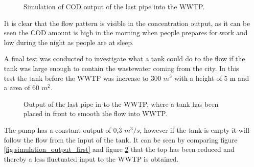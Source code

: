 \begin{figure}[H]
\centering

\caption{Simulation of COD output of the last pipe into the WWTP.}
\label{fig:simulation_output_first_concentration}
\end{figure}  

It is clear that the flow pattern is visible in the concentration output, as it can be seen the COD amount is high in the morning when people prepares for work and low during the night as people are at sleep.  


A final test was conducted to investigate what a tank could do to the flow if the tank was large enough to contain the wastewater coming from the city. In this test the tank before the WWTP was increase to 300 $m^3$ with a height of 5 m and a area of 60 $m^2$.

\begin{figure}[H]
\centering

\caption{Output of the last pipe in to the WWTP, where a tank has been placed in front to smooth the flow into WWTP.}
\label{fig:simulation_output_second}
\end{figure} 
The pump has a constant output of 0,3 $m^3/s$, however if the tank is empty it will follow the flow from the input of the tank. It can be seen by comparing figure \ref{fig:simulation_output_first} and figure \ref{fig:simulation_output_second} that the top has been reduced and thereby a less fluctuated input to the WWTP is obtained.   
			   